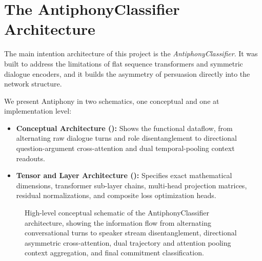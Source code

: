 \clearpage
\section{The AntiphonyClassifier Architecture}
\label{sec:antiphony}

The main intention architecture of this project is the \textit{AntiphonyClassifier}. It was built to address the limitations of flat sequence transformers and symmetric dialogue encoders, and it builds the asymmetry of persuasion directly into the network structure.

We present Antiphony in two schematics, one conceptual and one at implementation level:
\begin{itemize}
  \item \textbf{Conceptual Architecture ():} Shows the functional dataflow, from alternating raw dialogue turns and role disentanglement to directional question-argument cross-attention and dual temporal-pooling context readouts.
  \item \textbf{Tensor and Layer Architecture ():} Specifies exact mathematical dimensions, transformer sub-layer chains, multi-head projection matrices, residual normalizations, and composite loss optimization heads.
\end{itemize}

\begin{figure}[htbp]
  \centering
  \resizebox{\textwidth}{!}{}
  \caption{High-level conceptual schematic of the AntiphonyClassifier architecture, showing the information flow from alternating conversational turns to speaker stream disentanglement, directional asymmetric cross-attention, dual trajectory and attention pooling context aggregation, and final commitment classification.}
  \label{fig:antiphony_simple}
\end{figure}

